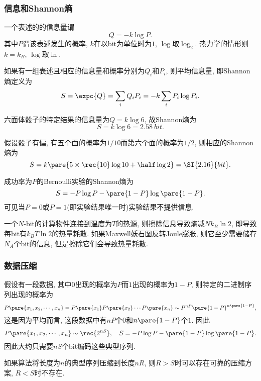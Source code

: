 \documentclass[../Thermal.tex]{subfiles}
\begin{document}
\subsubsection{信息和Shannon熵}
\begin{definition}[信息量]
一个表述的的信息量谓
\[ Q = -k \log P. \]
其中$P$谓该表述发生的概率, $k$在以bit为单位时为$1$, $\log$取$\log_2$. 热力学的情形则$k=k_B$, $\log$取$\ln$.
\end{definition}
\begin{definition}
如果有一组表述且相应的信息量和概率分别为$Q_i$和$P_i$, 则平均信息量, 即Shannon熵定义为
\[ S = \expc{Q} = \sum_i Q_i P_i = -k\sum_i P_i \log P_i. \]
\end{definition}
\begin{ex}
六面体骰子的特定结果的信息量为$Q = k \log 6$, 故Shannon熵为
\[ S = k\log 6 = \SI{2.58}{bit}. \]
\end{ex}
\begin{ex}
假设骰子有偏, 有五个面的概率为$1/10$而第六个面的概率为$1/2$, 则相应的Shannon熵为
\[ S = k \pare{5\times \rec{10}\log 10 + \half \log 2} = \SI{2.16}{bit}. \]
\end{ex}
\begin{ex}
成功率为$P$的Bernoulli实验的Shannon熵为
\[ S = -P\log P - \pare{1-P}\log\pare{1-P}. \]
可见当$P=0$或$P=1$(即实验结果唯一时)实验结果不提供信息.
\end{ex}
\begin{ex}[Maxwell妖]
一个$N$-bit的计算物件连接到温度为$T$的热源, 则擦除信息导致熵减$Nk_B\ln 2$, 即导致每bit有$k_B T\ln 2$的热量耗散. 如果Maxwell妖石图反转Joule膨胀, 则它至少需要储存$N_A$个bit的信息, 但是擦除它们会导致热量耗散.
\end{ex}
\subsubsection{数据压缩}
假设有一段数据, 其中$0$出现的概率为$P$而$1$出现的概率为$1-P$, 则特定的二进制序列出现的概率为
\[ P\pare{x_1, x_2, \cdots, x_n } = P\pare{x_1} P\pare{x_2} \cdots P\pare{x_n} \sim P^{nP}\pare{1-P}^{n\pare{1-P}}, \]
这是因为平均而言, 这段数据中有$nP$个$0$和$n\pare{1-P}$个$1$. 因此
\[ P\pare{x_1, x_2, \cdots, x_n } \sim \rec{2^{nS}},\quad S = -P\log P - \pare{1-P}\log\pare{1-P}. \]
因此大约只需要$nS$个bit编码这些典型序列.
\begin{theorem}[Shannon无噪声信道编码定理]
如果算法将长度为$n$的典型序列压缩到长度$nR$, 则$R > S$时可以存在可靠的压缩方案, $R < S$时不存在.
\end{theorem}
\end{document}
